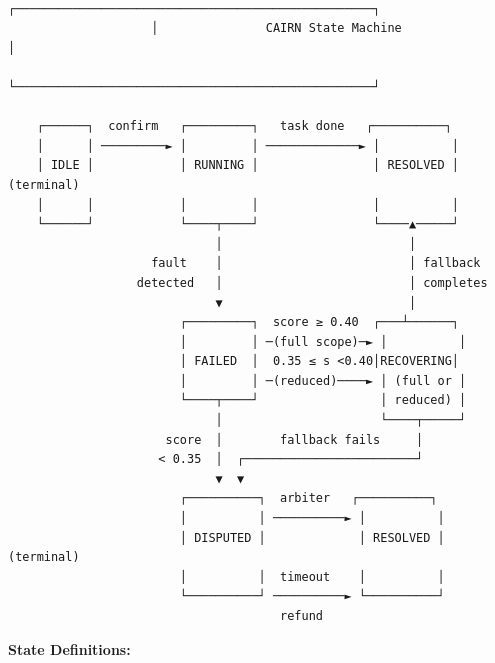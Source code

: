 \documentclass[
  10pt,
]{article}
\begin{document}
\begin{verbatim}
                    ┌──────────────────────────────────────────────────┐
                    │               CAIRN State Machine                │
                    └──────────────────────────────────────────────────┘

    ┌──────┐  confirm   ┌─────────┐   task done   ┌──────────┐
    │      │ ─────────► │         │ ─────────────► │          │
    │ IDLE │            │ RUNNING │                │ RESOLVED │ (terminal)
    │      │            │         │                │          │
    └──────┘            └────┬────┘                └────▲─────┘
                             │                          │
                    fault    │                          │ fallback
                  detected   │                          │ completes
                             ▼                          │
                        ┌─────────┐  score ≥ 0.40  ┌───┴──────┐
                        │         │ ─(full scope)─► │          │
                        │ FAILED  │  0.35 ≤ s <0.40│RECOVERING│
                        │         │ ─(reduced)────► │ (full or │
                        └────┬────┘                 │ reduced) │
                             │                      └────┬─────┘
                      score  │        fallback fails     │
                     < 0.35  │  ┌────────────────────────┘
                             ▼  ▼
                        ┌──────────┐  arbiter   ┌──────────┐
                        │          │ ──────────► │          │
                        │ DISPUTED │             │ RESOLVED │ (terminal)
                        │          │  timeout    │          │
                        └──────────┘ ──────────► └──────────┘
                                      refund
\end{verbatim}

\textbf{State Definitions:}
\end{document}
